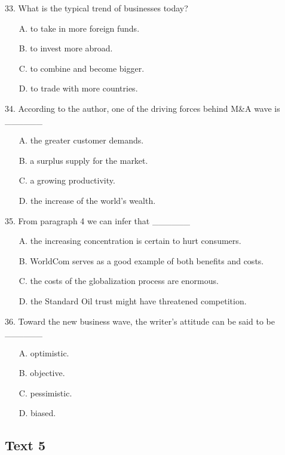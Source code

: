 \documentclass[UTF8,11pt]{ctexart}
\begin{document}
33. What is the typical trend of businesses today?


\begin{itemize}[leftmargin=2em,itemsep=.2em,topsep=.4em]\item[A.] to take in more foreign funds.
\item[B.] to invest more abroad.
\item[C.] to combine and become bigger.
\item[D.] to trade with more countries.
\end{itemize}

34. According to the author, one of the driving forces behind M\&A wave is \_\_\_\_\_\_


\begin{itemize}[leftmargin=2em,itemsep=.2em,topsep=.4em]\item[A.] the greater customer demands.
\item[B.] a surplus supply for the market.
\item[C.] a growing productivity.
\item[D.] the increase of the world’s wealth.
\end{itemize}

35. From paragraph 4 we can infer that \_\_\_\_\_\_


\begin{itemize}[leftmargin=2em,itemsep=.2em,topsep=.4em]\item[A.] the increasing concentration is certain to hurt consumers.
\item[B.] WorldCom serves as a good example of both benefits and costs.
\item[C.] the costs of the globalization process are enormous.
\item[D.] the Standard Oil trust might have threatened competition.
\end{itemize}

36. Toward the new business wave, the writer’s attitude can be said to be \_\_\_\_\_\_


\begin{itemize}[leftmargin=2em,itemsep=.2em,topsep=.4em]\item[A.] optimistic.
\item[B.] objective.
\item[C.] pessimistic.
\item[D.] biased.
\end{itemize}

\subsection*{\textbf{Text 5}}
\end{document}
